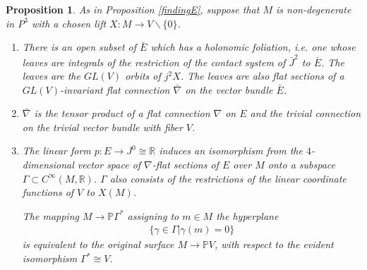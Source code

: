 \documentclass[11pt]{article}
\numberwithin{equation}{section}
\newcounter{count}
\theoremstyle{plain}
\newtheorem{proposition}[count]{Proposition}
\theoremstyle{remark}
\renewcommand{\P}{\mathbb{P}}
\newcommand{\GL}{GL}
\newcommand{\R}{\mathbb{R}}
\begin{document}
\begin{proposition} \label{idflat} As in Proposition \ref{findingE}, suppose that $M$ is non-degenerate in $P^{3}$ with a chosen lift $X:M\rightarrow  V \backslash \{0\}$.
\begin{enumerate}
\item{\label{integrableEbar}There is an open subset of $\bar{E}$ which has a holonomic foliation, i.e. one whose leaves are integrals of the restriction of the contact system of $\bar{J}^{2}$ to $\bar{E}$. The leaves are the $\GL(V)$ orbits of $j^{2}X$. The leaves are also flat sections of a $\GL(V)$-invariant flat connection $\bar{\nabla}$ on the vector bundle $\bar{E}$.}
\item{\label{descendToE}$\bar{\nabla}$ is the tensor product of a flat connection $\nabla$ on $E$ and the trivial connection on the trivial vector bundle with fiber $V$.}
\item{\label{viaG}The linear form $p:E\rightarrow  J^{0}\cong \R$ induces an isomorphism from the $4$-dimensional vector space of $\nabla$-flat sections of $E$ over $M$ onto a subspace $\Gamma\subset C^{\infty}(M,\R)$. $\Gamma$ also consists of the restrictions of the linear coordinate functions of $V$ to $X(M)$.

The mapping $M\rightarrow  \P\Gamma^{*}$ assigning to $m\in M$ the hyperplane
\begin{align*}\{\gamma\in\Gamma| \gamma(m)=0\}\end{align*}
is equivalent to the original surface $M\rightarrow \P V$, with respect to the evident isomorphism $\Gamma^*\cong V$.
}
\end{enumerate}
\end{proposition}
\end{document}
